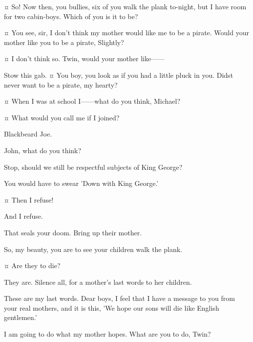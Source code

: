 \begin{drama}
\hookspeaks {}¤
So!
Now then, you bullies, six of you walk the plank to-night, but I have room for two cabin-boys.
Which of you is it to be?

\tootlesspeaks {}¤
You see, sir, I don't think my mother would like me to be a pirate.
Would your mother like you to be a pirate, Slightly?

\slightlyspeaks {}¤
I don't think so.
Twin, would your mother like——

\hookspeaks
Stow this gab.
¤
You boy, you look as if you had a little pluck in you.
Didst never want to be a pirate, my hearty?

\johnspeaks {}¤
When I was at school I——what do you think, Michael?

\michaelspeaks {}¤
What would you call me if I joined?

\hookspeaks
Blackbeard Joe.

\michaelspeaks
John, what do you think?

\johnspeaks
Stop, should we still be respectful subjects of King George?

\hookspeaks
You would have to swear 'Down with King George.'

\johnspeaks {}¤
Then I refuse!

\michaelspeaks
And I refuse.

\hookspeaks
That seals your doom.
Bring up their mother.


So, my beauty, you are to see your children walk the plank.

\wendyspeaks {}¤
Are they to die?

\hookspeaks
They are.
Silence all, for a mother's last words to her children.

\wendyspeaks
These are my last words.
Dear boys, I feel that I have a message to you from your real mothers, and it is this,
'We hope our sons will die like English gentlemen.'


\tootlesspeaks
I am going to do what my mother hopes.
What are you to do, Twin?


\end{drama}
